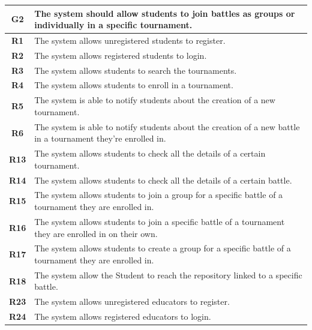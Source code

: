 \documentclass[12pt, a4paper]{report}
\begin{document}
    \begin{table}[H]
        \begin{tabularx}{\textwidth}{cX}
        \textbf{G2} & The system should allow students to join battles as groups or individually in a specific tournament.  \\
        \hline
        \textbf{R1}  & The system allows unregistered students to register.                             \\
        \textbf{R2}  & The system allows registered students to login.                                  \\
        \textbf{R3}  & The system allows students to search the tournaments.                            \\
        \textbf{R4}  & The system allows students to enroll in a tournament.                            \\
        \textbf{R5}  & The system is able to notify students about the creation of a new tournament.    \\
        \textbf{R6}  & The system is able to notify students about the creation of a new battle
                        in a tournament they’re enrolled in.                                            \\
        \textbf{R13} & The system allows students to check all the details of a certain tournament.     \\
        \textbf{R14} & The system allows students to check all the details of a certain battle.     \\
        \textbf{R15} & The system allows students to join a group for a specific battle of a
                        tournament they are enrolled in.     \\
        \textbf{R16} & The system allows students to join a specific battle of a tournament
                        they are enrolled in on their own.\\
        \textbf{R17} & The system allows students to create a group for a specific battle of a
                        tournament they are enrolled in. \\
        \textbf{R18} & The system allow the Student to reach the repository linked to a specific
                        battle.\\
        \textbf{R23} & The system allows unregistered educators to register.                            \\
        \textbf{R24} & The system allows registered educators to login.                                 \\

\end{tabularx}
\end{table}
\end{document}
